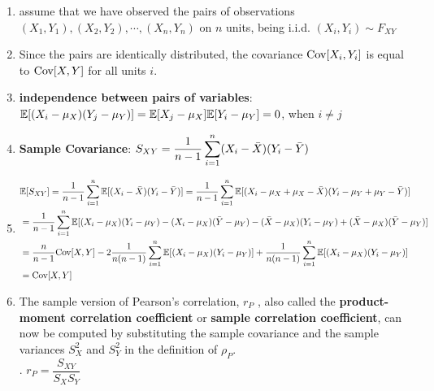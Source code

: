 \begin{enumerate}
    \item assume that we have observed the pairs of observations $(X_1, Y_1), (X_2, Y_2), \cdots , (X_n , Y_n )$ on $n$ units, being i.i.d. $(X_i , Y_i ) \sim F_{X Y}$
    \hfill \cite{statistics/book/Statistics-for-Data-Scientists/Maurits-Kaptein}

    \item Since the pairs are identically distributed, the covariance $\text{Cov}[X_i , Y_i]$ is equal to $\text{Cov}[X, Y]$ for all units $i$.
    \hfill \cite{statistics/book/Statistics-for-Data-Scientists/Maurits-Kaptein}

    \item \textbf{independence between pairs of variables}: $\mathbb{E}[(X_i - \mu_X )(Y_j - \mu_Y )] = \mathbb{E}[X_j - \mu_X] \mathbb{E}[Y_i - \mu_Y] = 0$, when $i \neq j$
    \hfill \cite{statistics/book/Statistics-for-Data-Scientists/Maurits-Kaptein}

    \item \textbf{Sample Covariance}:
    $
        S_{X Y} = \dfrac{1 }{n - 1} \displaystyle\sum^n_{i=1} (X_i - \bar{X})(Y_i - \bar{Y} )
    $
    \hfill \cite{statistics/book/Statistics-for-Data-Scientists/Maurits-Kaptein}

    \item
    $
        \begin{aligned}
            &\mathbb{E}[S_{X Y}]
            = \dfrac{1}{n - 1} \displaystyle\sum_{i=1}^n \mathbb{E}[(X_i - \bar{X} )(Y_i - \bar{Y} )]
            = \dfrac{1}{n - 1} \displaystyle\sum_{i=1}^n\mathbb{E}[(X_i - \mu_X + \mu_X - \bar{X})(Y_i - \mu_Y + \mu_Y - \bar{Y} )]  \\
            &= \dfrac{1}{n - 1} \displaystyle\sum_{i=1}^n\mathbb{E}[(X_i - \mu_X )(Y_i - \mu_Y ) - (X_i - \mu_X )( \bar{Y} - \mu_Y ) - ( \bar{X} - \mu_X )(Y_i - \mu_Y ) + ( \bar{X} - \mu_X )( \bar{Y} - \mu_Y )] \\
            &= \dfrac{n}{n - 1} \text{Cov}[X, Y] - 2 \dfrac{1}{n(n - 1)} \displaystyle\sum_{i=1}^n\mathbb{E}[(X_i - \mu_X )(Y_i - \mu_Y )] + \dfrac{1}{n(n - 1)} \displaystyle\sum_{i=1}^n \mathbb{E}[(X_i - \mu_X )(Y_i - \mu_Y )] \\
            &= \text{Cov}[X, Y]
        \end{aligned}
    $
    \hfill \cite{statistics/book/Statistics-for-Data-Scientists/Maurits-Kaptein}

    \item The sample version of Pearson’s correlation, $r_P$ , also called the \textbf{product-moment correlation coefficient} or \textbf{sample correlation coefficient}, can now be computed by substituting the sample covariance and the sample variances $S^2_X$ and $S^2_Y$ in the definition of $\rho_P$.
    \hfill \cite{statistics/book/Statistics-for-Data-Scientists/Maurits-Kaptein}
    \\
    .\hfill
    $
        r_P = \dfrac{S_{X Y} }{S_X S_Y}
    $
    \hfill \cite{statistics/book/Statistics-for-Data-Scientists/Maurits-Kaptein}


\end{enumerate}
